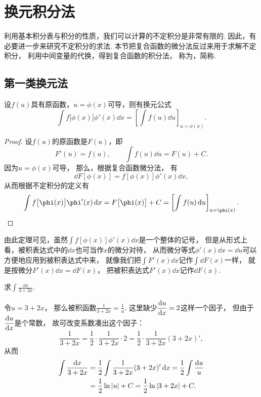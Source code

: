 \section{换元积分法}
利用基本积分表与积分的性质，我们可以计算的不定积分是非常有限的.
因此，有必要进一步来研究不定积分的求法.
本节把复合函数的微分法反过来用于求解不定积分，
利用中间变量的代换，得到复合函数的积分法，
称为，简称.

\subsection{第一类换元法}
\begin{theorem}
设\(f(u)\)具有原函数，\(u=\phi(x)\)可导，则有换元公式\[
	\int f\bigl[\phi(x)\bigr] \phi'(x) \dd{x}
	= \left[ \int f(u) \dd{u} \right]_{u=\phi(x)}.
\]
\begin{proof}
设\(f(u)\)的原函数是\(F(u)\)，即\[
	F'(u) = f(u),
	\qquad
	\int f(u) \dd{u} = F(u) + C.
\]
因为\(u = \phi(x)\)可导，
那么，根据复合函数微分法，
有\[
	\dd{F\left[\phi(x)\right]} = f\left[\phi(x)\right] \phi'(x) \dd{x},
\]
从而根据不定积分的定义有\[
	\int f\bigl[\phi(x)\bigr] \phi'(x) \dd{x}
	= F\bigl[\phi(x)\bigr] + C
	= \left[ \int f(u) \dd{u} \right]_{u=\phi(x)}.
	\qedhere
\]
\end{proof}
\end{theorem}

由此定理可见，虽然\(\int f[\phi(x)] \phi'(x) \dd{x}\)是一个整体的记号，
但是从形式上看，被积表达式中的\(\dd{x}\)也可当作\(x\)的微分对待，
从而微分等式\(\phi'(x) \dd{x} = \dd{u}\)可以方便地应用到被积表达式中来，
就像我们把\(\int F'(x) \dd{x}\)记作\(\int \dd{F(x)}\)一样，
就是按微分\(F'(x) \dd{x} = \dd{F(x)}\)，
把被积表达式\(F'(x) \dd{x}\)记作\(\dd{F(x)}\).

\begin{example}
求\(\int \frac{\dd{x}}{3+2x}\).
\begin{solution}
令\(u = 3+2x\)，
那么被积函数\(\frac{1}{3+2x} = \frac{1}{u}\).
这里缺少\(\displaystyle\dv{u}{x}=2\)这样一个因子，
但由于\(\displaystyle\dv{u}{x}\)是个常数，
故可改变系数凑出这个因子：\[
	\frac{1}{3+2x}
	= \frac{1}{2} \cdot \frac{1}{3+2x} \cdot 2
	= \frac{1}{2} \cdot \frac{1}{3+2x} (3+2x)',
\]
从而\begin{align*}
	\int \frac{\dd{x}}{3+2x}
	&= \frac{1}{2} \int \frac{1}{3+2x} (3+2x)' \dd{x}
	= \frac{1}{2} \int \frac{\dd{u}}{u} \\
	&= \frac{1}{2} \ln\abs{u} + C
	= \frac{1}{2} \ln\abs{3+2x} + C.
\end{align*}
\end{solution}
\end{example}

